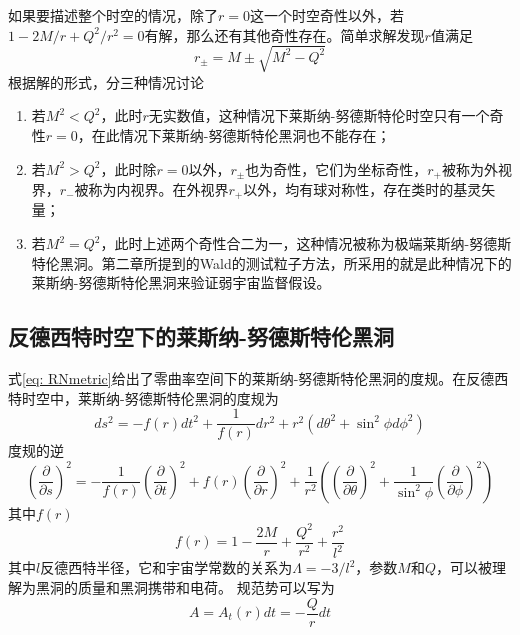 如果要描述整个时空的情况，除了$r=0$这一个时空奇性以外，若$1-2M / r+Q^2 / r^2=0$有解，那么还有其他奇性存在。简单求解发现$r$值满足
\begin{equation}\label{eq: RNhorizon}
    r_{\pm}=M \pm \sqrt{M^2-Q^2}
\end{equation}
根据解的形式，分三种情况讨论
\begin{enumerate}
    \item 若$M^2<Q^2$，此时$r$无实数值，这种情况下莱斯纳-努德斯特伦时空只有一个奇性$r=0$，在此情况下莱斯纳-努德斯特伦黑洞也不能存在；
    \item 若$M^2>Q^2$，此时除$r=0$以外，$r_{\pm}$也为奇性，它们为坐标奇性\citep{梁灿彬2006微分几何入门与广义相对论}，$r_+$被称为外视界，$r_-$被称为内视界。在外视界$r_+$以外，均有球对称性，存在类时的基灵矢量；
    \item 若$M^2=Q^2$，此时上述两个奇性合二为一，这种情况被称为极端莱斯纳-努德斯特伦黑洞。第二章所提到的Wald的测试粒子方法\citep{wald1974gedanken}，所采用的就是此种情况下的莱斯纳-努德斯特伦黑洞来验证弱宇宙监督假设。
\end{enumerate}
\subsection{反德西特时空下的莱斯纳-努德斯特伦黑洞}
式\eqref{eq: RNmetric}给出了零曲率空间下的莱斯纳-努德斯特伦黑洞的度规。在反德西特时空中，莱斯纳-努德斯特伦黑洞的度规为
\begin{equation}\label{eq: RN-AdSmetric}
    ds^2=-f\left(r\right)dt^2+\frac{1}{f\left(r\right)}dr^2+r^2\left(d\theta^2+\sin^2\phi d\phi ^2\right)
\end{equation}
度规的逆
\begin{equation}\label{eq: RN-AdSinversmetric}
    \left(\frac{\partial }{\partial s}\right)^2=-\frac{1}{f\left(r\right)}\left(\frac{\partial }{\partial t}\right)^2+f\left(r\right)\left(\frac{\partial }{\partial r}\right)^2+\frac{1}{r^2}\left(\left(\frac{\partial }{\partial \theta}\right)^2+\frac{1}{\sin ^2 \phi}\left(\frac{\partial }{\partial \phi}\right)^2\right)
\end{equation}
其中$f\left(r\right)$
\begin{equation}\label{eq: f(r)}
    f\left(r\right)=1-\frac{2M}{r}+\frac{Q^2}{r^2}+\frac{r^2}{l^2}
\end{equation}
其中$l$反德西特半径，它和宇宙学常数的关系为$\Lambda=-3/l^2$，参数$M$和$Q$，可以被理解为黑洞的质量和黑洞携带和电荷。
规范势可以写为
\begin{equation}\label{eq: vectorpotion}
    A=A_t\left(r\right)dt=-\frac{Q}{r}dt
\end{equation}

